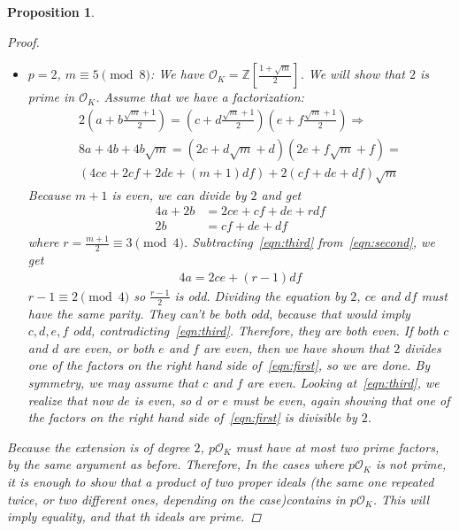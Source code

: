 \documentclass[11pt]{article}
\newtheorem{prop}{Proposition}
\theoremstyle{definition}
\begin{document}
\begin{prop}
\begin{proof}
\begin{itemize}
                \item $p=2$, $m \equiv 5 \pmod 8$: We have $\mathcal{O}_K = \mathbb{Z}\left[\frac{1+\sqrt {m}}{2}\right]$.
                We will show that $2$ is prime in $\mathcal{O}_K$.
                Assume that we have a factorization:
                \begin{gather}
                    2\left(a+b\frac{\sqrt {m}+1}{2}\right) = \left(c+d\frac{\sqrt {m}+1}{2}\right)\left(e+f\frac{\sqrt {m}+1}{2}\right) \Rightarrow \label{eqn:first} \\
                    8a + 4b + 4b\sqrt {m} =
                    (2c+d\sqrt {m}+d)(2e+f\sqrt {m}+f) = \nonumber \\
                    (4ce + 2cf + 2de + (m+1)df) + 2(cf+de+df)\sqrt {m} \nonumber
                \end{gather}
                Because $m+1$ is even, we can divide by $2$ and get
                \begin{align}
                    4a + 2b &= 2ce + cf + de + rdf \label{eqn:second} \\
                    2b &= cf+ de + df \label{eqn:third}
                \end{align}
                where $r = \frac{m+1}{2} \equiv 3 \pmod 4$.
                Subtracting~\eqref{eqn:third} from~\eqref{eqn:second}, we get
                \begin{align*}
                    4a = 2ce + (r-1)df
                \end{align*}
                $r - 1 \equiv 2 \pmod 4$ so $\frac{r-1}{2}$ is odd.
                Dividing the equation by $2$,
                $ce$ and $df$ must have the same parity.
                They can't be both odd, because that would imply $c, d, e, f$ odd,
                contradicting~\eqref{eqn:third}.
                Therefore, they are both even.
                If both $c$ and $d$ are even, or both $e$ and $f$ are even, then
                we have shown that $2$ divides one of the factors on the right hand side of~\eqref{eqn:first},
                so we are done.
                By symmetry, we may assume that $c$ and $f$ are even.
                Looking at~\eqref{eqn:third}, we realize that now $de$ is even, so $d$ or $e$ must be even,
                again showing that one of the factors on the right hand side of~\eqref{eqn:first} is divisible by $2$.
            \end{itemize}
            Because the extension is of degree $2$, $p\mathcal{O}_K$ must have at most two prime factors, by the same argument as before.
            Therefore, In the cases where $p\mathcal{O}_K$ is not prime, it is enough to show that a product of two proper ideals
            (the same one repeated twice, or two different ones, depending on the case)contains in $p\mathcal{O}_K$.
            This will imply equality, and that th ideals are prime.



\end{proof}
\end{prop}
\end{document}

